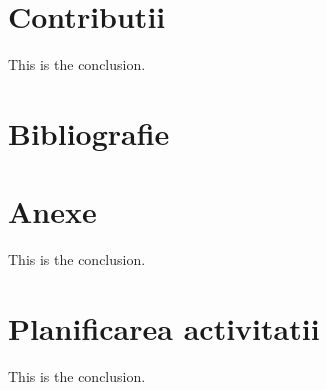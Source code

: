 \documentclass[titlepage,12pt]{article}
\begin{document}
\section{Contributii}
This is the conclusion.

\section{Bibliografie}
\printbibliography
\clearpage

\section{Anexe}
This is the conclusion.

\section{Planificarea activitatii}
This is the conclusion.
\end{document}
